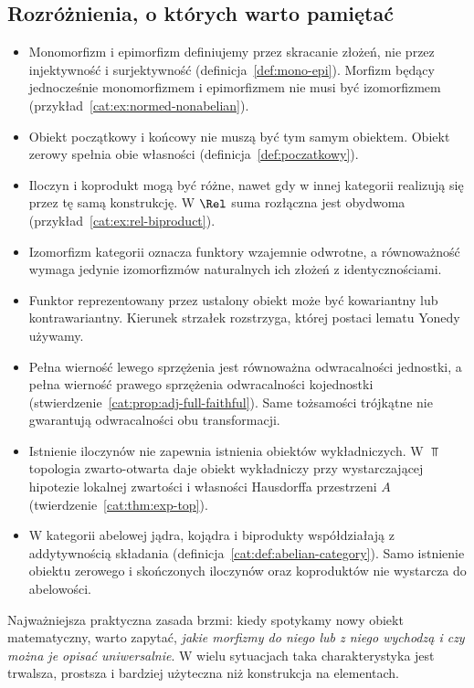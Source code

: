 \subsection{Rozróżnienia, o których warto pamiętać}\label{cat:sec:summary-pitfalls}
\begin{itemize}
\item Monomorfizm i epimorfizm definiujemy przez skracanie złożeń, nie przez injektywność i surjektywność (definicja~\ref{def:mono-epi}). Morfizm będący jednocześnie monomorfizmem i epimorfizmem nie musi być izomorfizmem (przykład~\ref{cat:ex:normed-nonabelian}).
\item Obiekt początkowy i końcowy nie muszą być tym samym obiektem. Obiekt zerowy spełnia obie własności (definicja~\ref{def:poczatkowy}).
\item Iloczyn i koprodukt mogą być różne, nawet gdy w innej kategorii realizują się przez tę samą konstrukcję. W $\Rel$ suma rozłączna jest obydwoma (przykład~\ref{cat:ex:rel-biproduct}).
\item Izomorfizm kategorii oznacza funktory wzajemnie odwrotne, a równoważność wymaga jedynie izomorfizmów naturalnych ich złożeń z identycznościami.
\item Funktor reprezentowany przez ustalony obiekt może być kowariantny lub kontrawariantny. Kierunek strzałek rozstrzyga, której postaci lematu Yonedy używamy.
\item Pełna wierność lewego sprzężenia jest równoważna odwracalności jednostki, a pełna wierność prawego sprzężenia odwracalności kojednostki (stwierdzenie~\ref{cat:prop:adj-full-faithful}). Same tożsamości trójkątne nie gwarantują odwracalności obu transformacji.
\item Istnienie iloczynów nie zapewnia istnienia obiektów wykładniczych. W $\Top$ topologia zwarto-otwarta daje obiekt wykładniczy przy wystarczającej hipotezie lokalnej zwartości i własności Hausdorffa przestrzeni $A$ (twierdzenie~\ref{cat:thm:exp-top}).
\item W kategorii abelowej jądra, kojądra i biprodukty współdziałają z addytywnością składania (definicja~\ref{cat:def:abelian-category}). Samo istnienie obiektu zerowego i skończonych iloczynów oraz koproduktów nie wystarcza do abelowości.
\end{itemize}

Najważniejsza praktyczna zasada brzmi: kiedy spotykamy nowy obiekt matematyczny, warto zapytać, \emph{jakie morfizmy do niego lub z niego wychodzą i czy można je opisać uniwersalnie}. W wielu sytuacjach taka charakterystyka jest trwalsza, prostsza i bardziej użyteczna niż konstrukcja na elementach.
